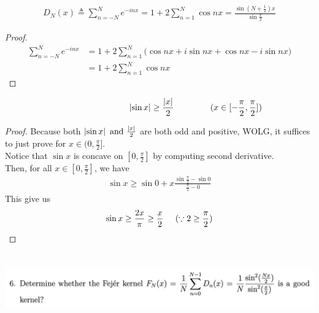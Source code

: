 \documentclass{report}
\begin{document}
\begin{lemma}
\label{Dkernel variant}
\begin{align*}
D_N(x)\triangleq \sum_{n=-N}^{N}e^{-inx}=1+2\sum_{n=1}^N \cos nx = \frac{\sin (N+\frac{1}{2})x}{\sin \frac{x}{2}}
\end{align*}
\end{lemma}
\begin{proof}
\begin{align*}
\sum_{n=-N}^{N}e^{-i nx}&=1+2\sum_{n=1}^N \big(\cos nx+ i \sin nx + \cos nx - i \sin nx \big)\\
&=1+2\sum_{n=1}^N \cos nx
\end{align*}
\end{proof}
\begin{lemma}
\label{sinx/2}
\begin{align*}
\hspace{3cm}\abso{\sin x}\geq \frac{\abso{x}}{2}\hspace{1.5cm}(x\in  [-\frac{\pi}{2},\frac{\pi}{2}] )
\end{align*}
\end{lemma}
\begin{proof}
Because both $\left|\sin x\right|\text{ and }\frac{\left|x\right|}{2}$ are both odd and positive, WOLG, it suffices to just prove  for $x \in (0,\frac{\pi}{2}]$.\\

Notice that $\sin x$ is concave on $[0,\frac{\pi}{2}]$ by computing second derivative.\\

Then, for all $x\in [0,\frac{\pi}{2}]$, we have
\begin{align*}
\sin x \geq \sin 0+ x \frac{\sin \frac{\pi}{2}- \sin 0}{\frac{\pi}{2}-0}
\end{align*}
This give us 
\begin{align*}
\sin x\geq \frac{2x}{\pi}\geq \frac{x}{2}\hspace{0.5cm}(\because 2\geq  \frac{\pi}{2} )
\end{align*}
\end{proof}
\begin{question}{}{}
\includegraphics[height=3cm,width=18cm]{hw3q6}
\end{question}
\end{document}

